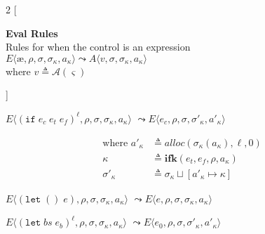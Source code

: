 \documentclass[12pt,draft]{article}
\newcommand\mae{\ensuremath{\text{\ae}}}
\newcommand{\ifsyn}[3]{(\texttt{if}\;#1\;#2\;#3)}
\begin{document}
\newpage
\footnotesize{
\begin{multicols*}{2}
[
\begin{center}
\textbf{Eval Rules} \\
Rules for when the control is an expression \\
\vspace{3mm}
$E\langle \mae , \rho , \sigma , \sigma_\kappa , a_\kappa\rangle
\leadsto
A\langle v , \sigma , \sigma_\kappa , a_\kappa  \rangle$ \\
where $v \triangleq \mathcal{A}(\varsigma)$
\end{center}
]
\begin{center}
  $E\langle \ifsyn{e_c}{e_t}{e_f}^\ell , \rho , \sigma , \sigma_\kappa , a_\kappa \rangle$
  $\leadsto E\langle e_c , \rho , \sigma , \sigma'_\kappa , a'_\kappa\rangle$
\end{center}
\vspace{-5mm}
\begin{align*}
  \text{where }
  a'_\kappa &\triangleq alloc(\sigma_\kappa(a_\kappa), \ell, 0) \\
  \kappa &\triangleq \textbf{ifk}(e_t, e_f, \rho, a_\kappa) \\
  \sigma'_\kappa &\triangleq \sigma_\kappa \sqcup [a'_\kappa \mapsto \kappa]
\end{align*}
\begin{center}
  $E\langle (\texttt{let}\;()\;e) , \rho , \sigma,\sigma_\kappa,a_\kappa \rangle$
  $\leadsto E\langle e , \rho , \sigma , \sigma_\kappa , a_\kappa \rangle$
\end{center}
\vspace{-5mm}
\begin{center}
  $E\langle (\texttt{let}\;bs\;e_b)^\ell,\rho , \sigma , \sigma_\kappa,a_\kappa\rangle$
   $\leadsto E\langle e_0 , \rho , \sigma , \sigma'_\kappa , a'_\kappa\rangle$
\end{center}
\vspace{-7mm}

\end{multicols*}}
\end{document}

